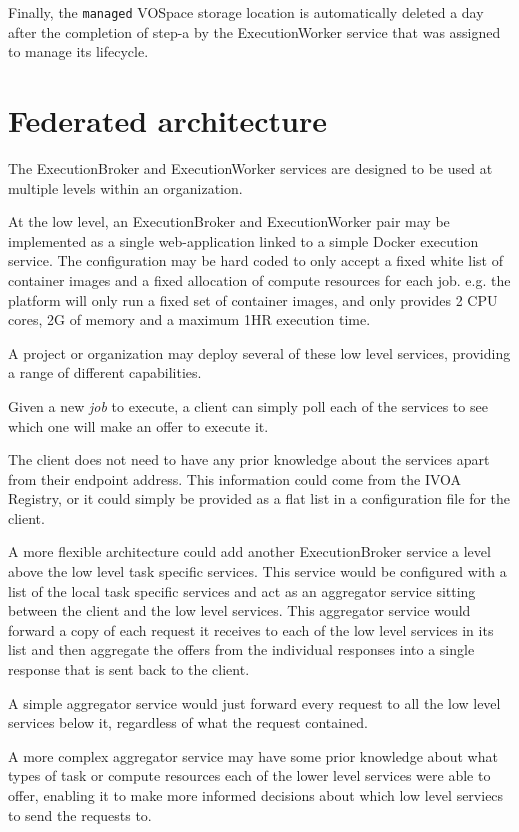 \documentclass[11pt,a4paper]{ivoa}
\newcommand{\ivoa} {IVOA}
\newcommand{\vospace} {VOSpace}
\newcommand{\execbrokerclass} {ExecutionBroker}
\newcommand{\execworkerclass} {ExecutionWorker}
\newcommand{\docker} {Docker}
\newcommand{\codeword}[1] {\texttt{#1}}
\newcommand{\cpu} {CPU}
\newcommand{\job} {\textit{job}}
\begin{document}
Finally, the \codeword{managed} \vospace{} storage location is automatically
deleted a day after the completion of step-a by the \execworkerclass{} service
that was assigned to manage its lifecycle.

\pagebreak

\section{Federated architecture}
\label{federation}

The \execbrokerclass{} and \execworkerclass{} services are designed to be used at multiple levels within an organization.

At the low level, an \execbrokerclass{} and \execworkerclass{} pair may be implemented as a
single web-application linked to a simple \docker{} execution service.
The configuration may be hard coded to only accept a fixed white list of container images
and a fixed allocation of compute resources for each job{}.
e.g. the platform will only run a fixed set of container images, and only provides 2 \cpu{} cores, 2G of memory and a maximum 1HR execution time.

A project or organization may deploy several of these low level services,
providing a range of different capabilities.

Given a new \job{} to execute, a client can simply poll each of the services to see which one will
make an offer to execute it.

The client does not need to have any prior knowledge about the services apart from their
endpoint address.
This information could come from the \ivoa{} Registry, or it could simply
be provided as a flat list in a configuration file for the client.

A more flexible architecture could add another \execbrokerclass{} service
a level above the low level task specific services.
This service would be configured with a list of the local task specific services
and act as an aggregator service sitting between the client and the low level services.
This aggregator service would forward a copy of each request it receives to each of the low level services in its list and
then aggregate the offers from the individual responses into a single response that is sent back to the client.

A simple aggregator service would just forward every request to all the low level services below it,
regardless of what the request contained.

A more complex aggregator service may have some prior knowledge about what types of task or compute resources
each of the lower level services were able to offer, enabling it to make more informed decisions about
which low level serviecs to send the requests to.
\end{document}
